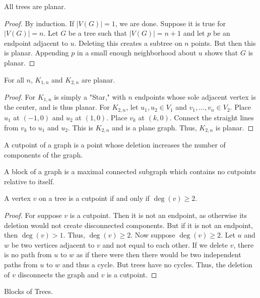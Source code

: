    \begin{theorem}
    All trees are planar.
    \end{theorem}
    \begin{proof}
    By induction. If $|V(G)| = 1$, we are done. Suppose it is true for $|V(G)| = n$. Let $G$ be a tree such that $|V(G)| = n+1$ and let $p$ be an endpoint adjacent to $u$. Deleting this creates a subtree on $n$ points. But then this is planar. Appending $p$ in a small enough neighborhood about $u$ shows that $G$ is planar.
    \end{proof}
    \begin{theorem}
    For all $n$, $K_{1,n}$ and $K_{2,n}$ are planar.
    \end{theorem}
    \begin{proof}
    For $K_{1,n}$ is simply a "Star," with $n$ endpoints whose sole adjacent vertex is the center, and is thus planar. For $K_{2,n}$, let $u_1,u_2 \in V_1$ and $v_1,\hdots, v_n \in V_2$. Place $u_1$ at $(-1,0)$ and $u_2$ at $(1,0)$. Place $v_k$ at $(k,0)$. Connect the straight lines from $v_k$ to $u_1$ and $u_2$. This is $K_{2,n}$ and is a plane graph. Thus, $K_{2,n}$ is planar.
    \end{proof}
    \begin{definition}
    A cutpoint of a graph is a point whose deletion increases the number of components of the graph.
    \end{definition}
    \begin{definition}
    A block of a graph is a maximal connected subgraph which contains no cutpoints relative to itself.
    \end{definition}
    \begin{theorem}
    A vertex $v$ on a tree is a cutpoint if and only if $\deg(v) \geq 2$.
    \end{theorem}
    \begin{proof}
    For suppose $v$ is a cutpoint. Then it is not an endpoint, as otherwise its deletion would not create disconnected components. But if it is not an endpoint, then $\deg(v)>1$. Thus, $\deg(v)\geq 2$. Now suppose $\deg(v) \geq 2$. Let $u$ and $w$ be two vertices adjacent to $v$ and not equal to each other. If we delete $v$, there is no path from $u$ to $w$ as if there were then there would be two independent paths from $u$ to $w$ and thus a cycle. But trees have no cycles. Thus, the deletion of $v$ disconnects the graph and $v$ is a cutpoint.
    \end{proof}
    \begin{theorem}
    Blocks of Trees.
    \end{theorem}
